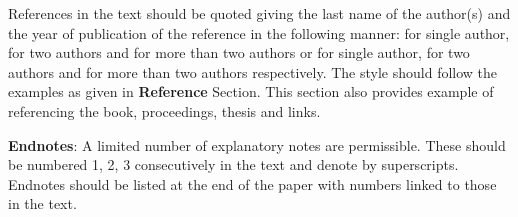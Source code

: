 \documentclass{jsce-word}
\begin{document}
References in the text should be quoted giving the last name of the author(s) and the year
of publication of the reference in the following manner: \citet{karanjit2017} for single
author, \citet{khadka2017} for two authors and \citet{burkard1993} for more than two authors
or \citep{karanjit2017} for single author, \citep{khadka2017} for two authors and
\citep{burkard1993} for more than two authors respectively. The style should follow the
examples as given in \textbf{Reference} Section. This section also provides example of
referencing the book, proceedings, thesis and links.

\nocite{*}



\textbf{Endnotes}: A limited number of explanatory notes are permissible. These should be
numbered 1, 2, 3 consecutively in the text and denote by superscripts. Endnotes should be
listed at the end of the paper with numbers linked to those in the text.
\end{document}
